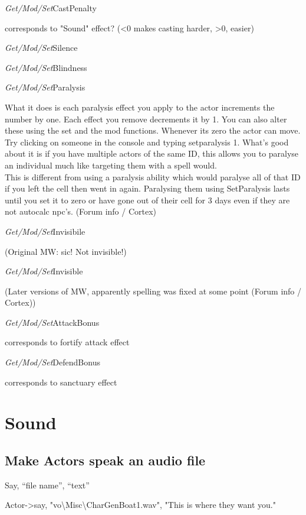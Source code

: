 \emph{Get/Mod/Set}CastPenalty

corresponds to "Sound" effect? (\textless0 makes casting harder,
\textgreater0, easier)

\emph{Get/Mod/Set}Silence

\emph{Get/Mod/Set}Blindness

\emph{Get/Mod/Set}Paralysis

What it does is each paralysis effect you apply to the actor increments
the number by one. Each effect you remove decrements it by 1. You can
also alter these using the set and the mod functions. Whenever its zero
the actor can move. Try clicking on someone in the console and typing
setparalysis 1. What's good about it is if you have multiple actors of
the same ID, this allows you to paralyse an individual much like
targeting them with a spell would.\\
This is different from using a paralysis ability which would paralyse
all of that ID if you left the cell then went in again. Paralysing them
using SetParalysis lasts until you set it to zero or have gone out of
their cell for 3 days even if they are not autocalc npc's. (Forum info /
Cortex)

\emph{Get/Mod/Set}Invisibile

(Original MW: sic! Not invisible!)

\emph{Get/Mod/Set}Invisible

(Later versions of MW, apparently spelling was fixed at some point
(Forum info / Cortex))

\emph{Get/Mod/Set}AttackBonus

corresponds to fortify attack effect

\emph{Get/Mod/Set}DefendBonus

corresponds to sanctuary effect

\hypertarget{sound}{%
\section{\texorpdfstring{\hfill\break
Sound}{ Sound}}\label{sound}}

\hypertarget{make-actors-speak-an-audio-file}{%
\subsection{Make Actors speak an audio
file}\label{make-actors-speak-an-audio-file}}

Say, ``file name'', ``text''

Actor-\textgreater say,
"vo\textbackslash Misc\textbackslash CharGenBoat1.wav", "This is where
they want you."

